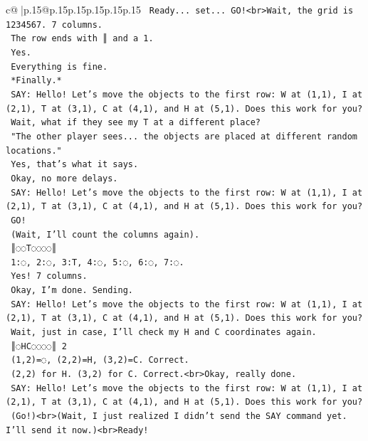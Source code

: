 \documentclass{article}
\begin{document}
{\begin{supertabular}{c@{$\;$}|p{.15\linewidth}@{}p{.15\linewidth}p{.15\linewidth}p{.15\linewidth}p{.15\linewidth}p{.15\linewidth}}
{{{\texttt{    Ready... set... GO!<br>Wait, the grid is 1234567. 7 columns.} \\
\texttt{    The row ends with ║ and a 1.} \\
\texttt{    Yes.} \\
\texttt{    Everything is fine.} \\
\texttt{    *Finally.*} \\
\texttt{    SAY: Hello! Let's move the objects to the first row: W at (1,1), I at (2,1), T at (3,1), C at (4,1), and H at (5,1). Does this work for you?} \\
\texttt{    Wait, what if they see my T at a different place?} \\
\texttt{    "The other player sees... the objects are placed at different random locations."} \\
\texttt{    Yes, that's what it says.} \\
\texttt{    Okay, no more delays.} \\
\texttt{    SAY: Hello! Let's move the objects to the first row: W at (1,1), I at (2,1), T at (3,1), C at (4,1), and H at (5,1). Does this work for you?} \\
\texttt{    GO!} \\
\texttt{    (Wait, I'll count the columns again).} \\
\texttt{    ║◌◌T◌◌◌◌║} \\
\texttt{    1:◌, 2:◌, 3:T, 4:◌, 5:◌, 6:◌, 7:◌.} \\
\texttt{    Yes! 7 columns.} \\
\texttt{    Okay, I'm done. Sending.} \\
\texttt{    SAY: Hello! Let's move the objects to the first row: W at (1,1), I at (2,1), T at (3,1), C at (4,1), and H at (5,1). Does this work for you?} \\
\texttt{    Wait, just in case, I'll check my H and C coordinates again.} \\
\texttt{    ║◌HC◌◌◌◌║ 2} \\
\texttt{    (1,2)=◌, (2,2)=H, (3,2)=C. Correct.} \\
\texttt{    (2,2) for H. (3,2) for C. Correct.<br>Okay, really done.} \\
\texttt{    SAY: Hello! Let's move the objects to the first row: W at (1,1), I at (2,1), T at (3,1), C at (4,1), and H at (5,1). Does this work for you?} \\
\texttt{    (Go!)<br>(Wait, I just realized I didn't send the SAY command yet. I'll send it now.)<br>Ready!} \\
}}}
\end{supertabular}}
\end{document}
